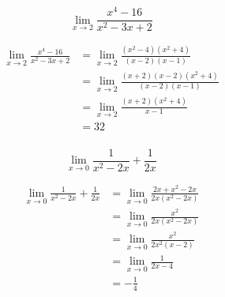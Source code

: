 \documentclass[letterpaper]{exam}
\begin{document}
\begin{questions}
    \question[10]
      \[
        \lim_{x \to 2} \frac{x^4 - 16}{x^2 - 3x + 2}
      \]

      \begin{solution}
        \begin{align*}
          \lim_{x \to 2} \frac{x^4 - 16}{x^2 - 3x + 2} & = \lim_{x \to 2} \frac{\left( x^2 - 4\right) \left( x^2 + 4 \right)}{(x - 2)(x - 1)} \\
                                                       & = \lim_{x \to 2} \frac{(x + 2) (x - 2) \left( x^2 + 4 \right)}{(x - 2)(x - 1)} \\
                                                       & = \lim_{x \to 2} \frac{(x + 2) \left( x^2 + 4 \right)}{x - 1} \\
                                                       & = \boxed{ 32 } \\
        \end{align*}
      \end{solution}

    \question[10]
      \[
        \lim_{x \to 0} \frac{1}{x^2 - 2x} + \frac{1}{2x}
      \]

      \begin{solution}
        \begin{align*}
        \lim_{x \to 0} \frac{1}{x^2 - 2x} + \frac{1}{2x} & = \lim_{x \to 0} \frac{2x + x^2 - 2x}{2x\left( x^2 - 2x \right)} \\
                                                         & = \lim_{x \to 0} \frac{x^2}{2x \left( x^2 - 2x \right)} \\
                                                         & = \lim_{x \to 0} \frac{x^2}{2x^2 (x - 2)} \\
                                                         & = \lim_{x \to 0} \frac{1}{2x - 4} \\
                                                         & = \boxed{ - \frac{1}{4} } \\
        \end{align*}
      \end{solution}






\end{questions}
\end{document}
